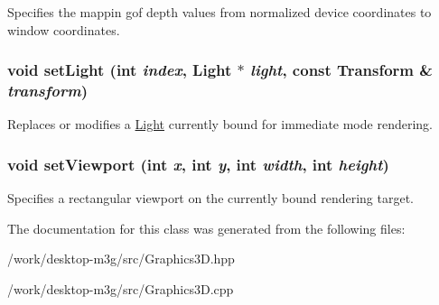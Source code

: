Specifies the mappin gof depth values from normalized device coordinates to window coordinates. \hypertarget{classm3g_1_1Graphics3D_2bf83cb69f50117dd9d5548fe96d0ab0}{
\subsubsection[{setLight}]{\setlength{\rightskip}{0pt plus 5cm}void setLight (int {\em index}, \/  {\bf Light} $\ast$ {\em light}, \/  const {\bf Transform} \& {\em transform})}}
\label{classm3g_1_1Graphics3D_2bf83cb69f50117dd9d5548fe96d0ab0}


Replaces or modifies a \hyperlink{classm3g_1_1Light}{Light} currently bound for immediate mode rendering. \hypertarget{classm3g_1_1Graphics3D_0b4ec48e9c19060e9be5648c118c23b1}{
\subsubsection[{setViewport}]{\setlength{\rightskip}{0pt plus 5cm}void setViewport (int {\em x}, \/  int {\em y}, \/  int {\em width}, \/  int {\em height})}}
\label{classm3g_1_1Graphics3D_0b4ec48e9c19060e9be5648c118c23b1}


Specifies a rectangular viewport on the currently bound rendering target. 

The documentation for this class was generated from the following files:\begin{CompactItemize}
\item 
/work/desktop-m3g/src/Graphics3D.hpp\item 
/work/desktop-m3g/src/Graphics3D.cpp\end{CompactItemize}
